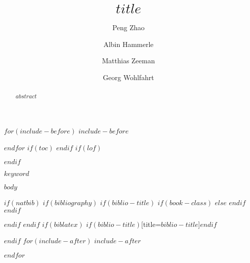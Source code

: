 \documentclass[review]{elsarticle}
\begin{document}
$for(include-before)$
$include-before$

$endfor$
$if(toc)$
{
\setcounter{tocdepth}{$toc-depth$}
\tableofcontents
}
$endif$
$if(lof)$
\listoffigures
$endif$

\title{$title$}
\author[mymainaddress]{Peng Zhao}
\author[mymainaddress]{Albin Hammerle}
\author[mysecondaryaddress]{Matthias Zeeman}
\author[mymainaddress]{Georg Wohlfahrt}


\address[mymainaddress]{Institute of Ecology, University of Innsbruck, Austria}
\address[mysecondaryaddress]{Karlsruhe Institute of Technology (KIT) Atmospheric Environmental Research Institute of Meteorology and Climate Research (IMK-IFU)}

\begin{frontmatter}

\begin{abstract}
$abstract$
\end{abstract}


\begin{keyword}
$keyword$
\end{keyword}

\end{frontmatter}

\linenumbers

$body$

$if(natbib)$
$if(bibliography)$
$if(biblio-title)$
$if(book-class)$
\renewcommand\bibname{$biblio-title$}
$else$
\renewcommand\refname{$biblio-title$}
$endif$
$endif$




$endif$
$endif$
$if(biblatex)$
\printbibliography$if(biblio-title)$[title=$biblio-title$]$endif$

$endif$
$for(include-after)$
$include-after$

$endfor$
\end{document}
